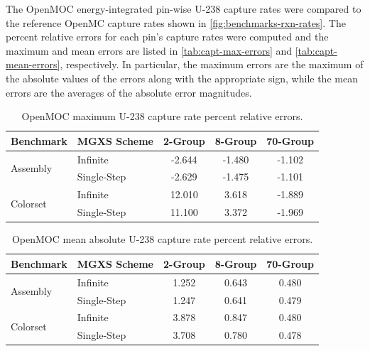 The OpenMOC energy-integrated pin-wise U-238 capture rates were compared to the reference OpenMC capture rates shown in \autoref{fig:benchmarks-rxn-rates}. The percent relative errors for each pin's capture rates were computed and the maximum and mean errors are listed in \autoref{tab:capt-max-errors} and \autoref{tab:capt-mean-errors}, respectively. In particular, the maximum errors are the maximum of the absolute values of the errors along with the appropriate sign, while the mean errors are the averages of the absolute error magnitudes.

\begin{table}[h!]
  \centering
  \caption{OpenMOC maximum U-238 capture rate percent relative errors.}
  \label{tab:capt-max-errors}
  \begin{tabular}{l l c c c}
  \toprule
  \textbf{Benchmark} & \textbf{MGXS Scheme} & \textbf{2-Group} & \textbf{8-Group} & \textbf{70-Group} \\
  \midrule
  \multirow{2}{*}{Assembly} & Infinite    & -2.644 & -1.480 & -1.102 \\
                            & Single-Step & -2.629 & -1.475 & -1.101 \\
  \midrule
  \multirow{2}{*}{Colorset} & Infinite    & 12.010 & 3.618 & -1.889 \\
                            & Single-Step & 11.100 & 3.372 & -1.969 \\
  \bottomrule
\end{tabular}
\end{table}

\begin{table}[h!]
  \centering
  \caption{OpenMOC mean absolute U-238 capture rate percent relative errors.}
  \label{tab:capt-mean-errors}
  \begin{tabular}{l l c c c}
  \toprule
  \textbf{Benchmark} & \textbf{MGXS Scheme} & \textbf{2-Group} & \textbf{8-Group} & \textbf{70-Group} \\
  \midrule
  \multirow{2}{*}{Assembly} & Infinite    & 1.252 & 0.643 & 0.480 \\
                            & Single-Step & 1.247 & 0.641 & 0.479 \\
  \midrule
  \multirow{2}{*}{Colorset} & Infinite    & 3.878 & 0.847 & 0.480 \\
                            & Single-Step & 3.708 & 0.780 & 0.478 \\
  \bottomrule
\end{tabular}
\end{table}

